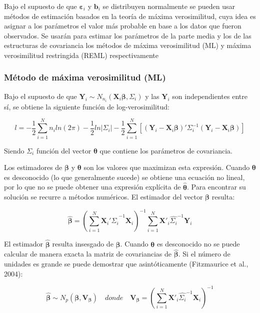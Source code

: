 \documentclass[spanish]{article}
\numberwithin{figure}{subsection}
\numberwithin{equation}{subsection}
\numberwithin{table}{subsection}
\begin{document}
Bajo el supuesto de que $\bm{\varepsilon}_i$ y $\bm{b}_i$ se distribuyen normalmente se
pueden usar métodos de estimación basados en la teoría de máxima verosimilitud,
cuya idea es asignar a los parámetros el valor más probable en base a los datos
que fueron observados. Se usarán para estimar los parámetros de la parte media
y los de las estructuras de covariancia los métodos de máxima verosimilitud
(ML) y máxima verosimilitud restringida (REML) respectivamente

\subsubsection{Método de máxima verosimilitud (ML)}

Bajo el supuesto de que $\bm{Y}_i \sim N_{n_i}(\bm{X}_i \bm{\beta},
\bm{\varSigma}_i)$ y las $\bm{Y}_i$
son independientes entre sí, se obtiene la siguiente función de
log-verosimilitud:

\begin{equation}
\label{ML}
	l = -\frac{1}{2} \sum_{i=1}^{N}n_i ln(2\pi) - \frac{1}{2}ln|\bm{\varSigma}_i| -
	\frac{1}{2} \sum_{i=1}^{N} [(\bm{Y}_i - \bm{X}_i\bm{\beta})'
	\bm{\varSigma}_i^{-1} (\bm{Y}_i - \bm{X}_i\bm{\beta})]
\end{equation}

Siendo $\bm{\varSigma}_i$ función del vector $\bm{\theta}$ que contiene los
parámetros de covariancia.

Los estimadores de $\bm{\beta}$ y $\bm{\theta}$ son los valores que maximizan
esta expresión. Cuando $\bm{\theta}$ es desconocido (lo que generalmente sucede)
se obtiene una ecuación no lineal, por lo que no se puede obtener una expresión
explícita de $\hat{\bm{\theta}}$. Para encontrar su solución se recurre a
métodos numéricos. El estimador del vector $\bm{\beta}$ resulta:

\[ \hat{\bm{\beta}} = (\sum_{i=1}^{N} \bm{X}_i'\hat{\bm{\varSigma}_i}^{-1}\bm{X}_i)^{-1}
\sum_{i=1}^{N} \bm{X}'_i\hat{\bm{\varSigma}_i}^{-1}\bm{Y}_i \]

El estimador $\hat{\bm{\beta}}$ resulta insesgado de $\bm{\beta}$. Cuando
$\bm{\theta}$ es desconocido no se puede calcular de manera exacta la matriz
de covariancias de $\hat{\bm{\beta}}$. Si el número de unidades es grande se
puede demostrar que asintóticamente (Fitzmaurice et al., 2004):

\[ \hat{\bm{\beta}} \sim N_p(\bm{\beta}, \bm{V}_{\bm{\beta}}) \quad donde \quad \bm{V}_{\bm{\beta}} =
(\sum_{i=1}^{N} \bm{X}'_i\hat{\bm{\varSigma}_i}^{-1}\bm{X}_i)^{-1} \]
\end{document}
